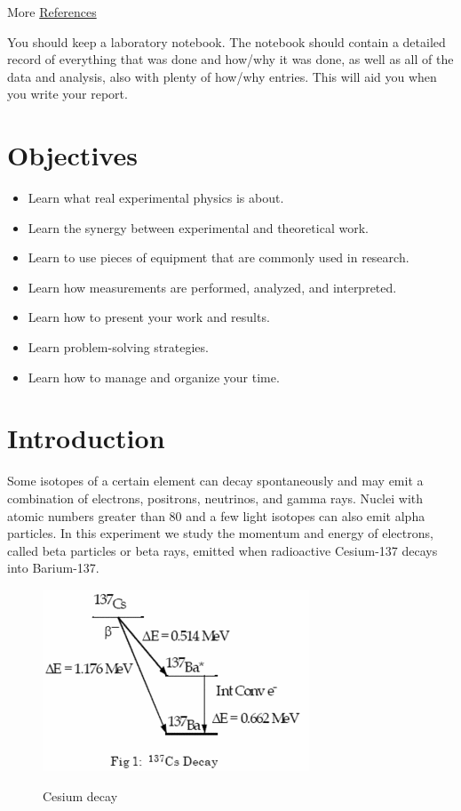 \documentclass{../lab}
\begin{document}
More \hyperref[sec:References]{References}

You should keep a laboratory notebook. The notebook should contain a detailed record of everything that was done and how/why it was done, as well as all of the data and analysis, also with plenty of how/why entries. This will aid you when you write your report.

\section{Objectives}

\begin{itemize}
    \item Learn what real experimental physics is about.

    \item Learn the synergy between experimental and theoretical work.

    \item Learn to use pieces of equipment that are commonly used in research.

    \item Learn how measurements are performed, analyzed, and interpreted.

    \item Learn how to present your work and results.

    \item Learn problem-solving strategies.

    \item Learn how to manage and organize your time.
\end{itemize}

\section{Introduction}

Some isotopes of a certain element can decay spontaneously and may emit a combination of electrons, positrons, neutrinos, and gamma rays. Nuclei with atomic numbers greater than 80 and a few light isotopes can also emit alpha particles. In this experiment we study the momentum and energy of electrons, called beta particles or beta rays, emitted when radioactive Cesium-137 decays into Barium-137.

\begin{figure}[h]
    \centering
    \href{http://experimentationlab.berkeley.edu/sites/default/files/images/300px-BRAimage003.gif}{\includegraphics[width=0.5\linewidth]{images/300px-BRAimage003.png}}
    \caption{Cesium decay}
    \label{fig:300px-BRAimage003}
\end{figure}
\end{document}
